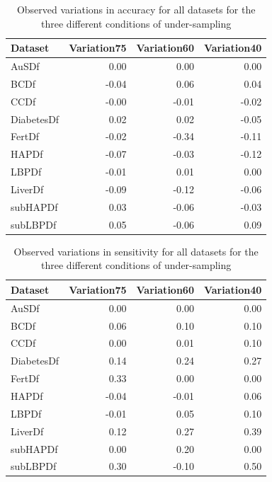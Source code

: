 \begin{table}[ht]
\centering
\begin{tabular}{lrrr}
  \hline
  \rowcolor{LightCyan}
Dataset & Variation75 & Variation60 & Variation40 \\ 
  \hline
AuSDf & 0.00 & 0.00 & 0.00 \\ 
  BCDf & -0.04 & 0.06 & 0.04 \\ 
  CCDf & -0.00 & -0.01 & -0.02 \\ 
  DiabetesDf & 0.02 & 0.02 & -0.05 \\ 
  FertDf & -0.02 & -0.34 & -0.11 \\ 
  HAPDf & -0.07 & -0.03 & -0.12 \\ 
  LBPDf & -0.01 & 0.01 & 0.00 \\ 
  LiverDf & -0.09 & -0.12 & -0.06 \\ 
  subHAPDf & 0.03 & -0.06 & -0.03 \\ 
  subLBPDf & 0.05 & -0.06 & 0.09 \\ 
   \hline
\end{tabular}
\caption{Observed variations in accuracy for all datasets for the three different conditions of under-sampling}
\label{tab:variationsAccu}
\end{table}

\begin{table}[ht]
\centering
\begin{tabular}{lrrr}
  \hline
   \rowcolor{LightCyan}
Dataset & Variation75 & Variation60 & Variation40 \\ 
  \hline
AuSDf & 0.00 & 0.00 & 0.00 \\ 
  BCDf & 0.06 & 0.10 & 0.10 \\ 
  CCDf & 0.00 & 0.01 & 0.10 \\ 
  DiabetesDf & 0.14 & 0.24 & 0.27 \\ 
  FertDf & 0.33 & 0.00 & 0.00 \\ 
  HAPDf & -0.04 & -0.01 & 0.06 \\ 
  LBPDf & -0.01 & 0.05 & 0.10 \\ 
  LiverDf & 0.12 & 0.27 & 0.39 \\ 
  subHAPDf & 0.00 & 0.20 & 0.00 \\ 
  subLBPDf & 0.30 & -0.10 & 0.50 \\ 
   \hline
\end{tabular}
\caption{Observed variations in sensitivity for all datasets for the three different conditions of under-sampling}
\label{tab:variationsSensi}
\end{table}

